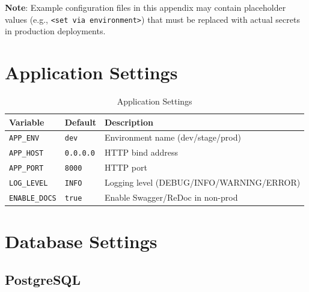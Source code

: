 \documentclass[a4paper,twoside]{sapthesis}
\begin{document}
\textbf{Note}: Example configuration files in this appendix may contain placeholder values (e.g., \texttt{<set via environment>}) that must be replaced with actual secrets in production deployments.

\section{Application Settings}
\label{app:config:app}

\begin{table}[ht]
\centering
\caption{Application Settings}
\label{tab:config-app}
\small
\begin{tabularx}{\textwidth}{llX}
    \hline
    \textbf{Variable} & \textbf{Default} & \textbf{Description} \\
    \hline
    \texttt{APP\_ENV} & \texttt{dev} & Environment name (dev/stage/prod) \\
    \texttt{APP\_HOST} & \texttt{0.0.0.0} & HTTP bind address \\
    \texttt{APP\_PORT} & \texttt{8000} & HTTP port \\
    \texttt{LOG\_LEVEL} & \texttt{INFO} & Logging level (DEBUG/INFO/WARNING/ERROR) \\
    \texttt{ENABLE\_DOCS} & \texttt{true} & Enable Swagger/ReDoc in non-prod \\
    \hline
\end{tabularx}
\end{table}

\section{Database Settings}
\label{app:config:database}

\subsection{PostgreSQL}
\end{document}

